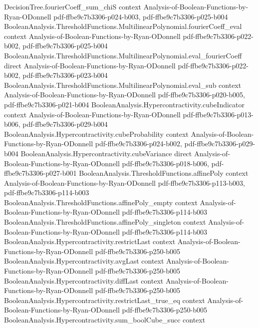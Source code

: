 \begin{theorem}
\proofstep
  {DecisionTree.fourierCoeff_sum_chiS}
  {context}
  {Analysis-of-Boolean-Functions-by-Ryan-ODonnell}
  {pdf-ffbe9c7b3306-p024-b003,
    pdf-ffbe9c7b3306-p025-b004}
\proofstep
  {BooleanAnalysis.ThresholdFunctions.MultilinearPolynomial.fourierCoeff_eval}
  {context}
  {Analysis-of-Boolean-Functions-by-Ryan-ODonnell}
  {pdf-ffbe9c7b3306-p022-b002,
    pdf-ffbe9c7b3306-p025-b004}
\proofstep
  {BooleanAnalysis.ThresholdFunctions.MultilinearPolynomial.eval_fourierCoeff}
  {direct}
  {Analysis-of-Boolean-Functions-by-Ryan-ODonnell}
  {pdf-ffbe9c7b3306-p022-b002,
    pdf-ffbe9c7b3306-p023-b004}
\proofstep
  {BooleanAnalysis.ThresholdFunctions.MultilinearPolynomial.eval_sub}
  {context}
  {Analysis-of-Boolean-Functions-by-Ryan-ODonnell}
  {pdf-ffbe9c7b3306-p020-b005,
    pdf-ffbe9c7b3306-p021-b004}
\proofstep
  {BooleanAnalysis.Hypercontractivity.cubeIndicator}
  {context}
  {Analysis-of-Boolean-Functions-by-Ryan-ODonnell}
  {pdf-ffbe9c7b3306-p013-b006,
    pdf-ffbe9c7b3306-p029-b004}
\proofstep
  {BooleanAnalysis.Hypercontractivity.cubeProbability}
  {context}
  {Analysis-of-Boolean-Functions-by-Ryan-ODonnell}
  {pdf-ffbe9c7b3306-p024-b002,
    pdf-ffbe9c7b3306-p029-b004}
\proofstep
  {BooleanAnalysis.Hypercontractivity.cubeVariance}
  {direct}
  {Analysis-of-Boolean-Functions-by-Ryan-ODonnell}
  {pdf-ffbe9c7b3306-p018-b006,
    pdf-ffbe9c7b3306-p027-b001}
\proofstep
  {BooleanAnalysis.ThresholdFunctions.affinePoly}
  {context}
  {Analysis-of-Boolean-Functions-by-Ryan-ODonnell}
  {pdf-ffbe9c7b3306-p113-b003,
    pdf-ffbe9c7b3306-p114-b003}
\proofstep
  {BooleanAnalysis.ThresholdFunctions.affinePoly_empty}
  {context}
  {Analysis-of-Boolean-Functions-by-Ryan-ODonnell}
  {pdf-ffbe9c7b3306-p114-b003}
\proofstep
  {BooleanAnalysis.ThresholdFunctions.affinePoly_singleton}
  {context}
  {Analysis-of-Boolean-Functions-by-Ryan-ODonnell}
  {pdf-ffbe9c7b3306-p114-b003}
\proofstep
  {BooleanAnalysis.Hypercontractivity.restrictLast}
  {context}
  {Analysis-of-Boolean-Functions-by-Ryan-ODonnell}
  {pdf-ffbe9c7b3306-p250-b005}
\proofstep
  {BooleanAnalysis.Hypercontractivity.avgLast}
  {context}
  {Analysis-of-Boolean-Functions-by-Ryan-ODonnell}
  {pdf-ffbe9c7b3306-p250-b005}
\proofstep
  {BooleanAnalysis.Hypercontractivity.diffLast}
  {context}
  {Analysis-of-Boolean-Functions-by-Ryan-ODonnell}
  {pdf-ffbe9c7b3306-p250-b005}
\proofstep
  {BooleanAnalysis.Hypercontractivity.restrictLast_true_eq}
  {context}
  {Analysis-of-Boolean-Functions-by-Ryan-ODonnell}
  {pdf-ffbe9c7b3306-p250-b005}
\proofstep
  {BooleanAnalysis.Hypercontractivity.sum_boolCube_succ}
  {context}

\end{theorem}
